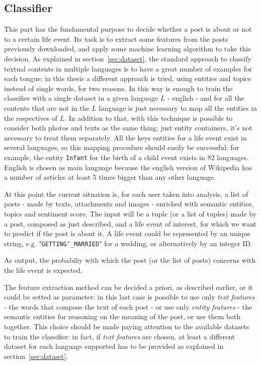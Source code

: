 \subsection{Classifier}
This part has the fundamental purpose to decide whether a post is about or not to a certain life event. Its task is to extract some features from the posts previously downloaded, and apply some machine learning algorithm to take this decision. As explained in section~\ref{sec:dataset}, the standard approach to classify textual contents in multiple languages is to have a great number of examples for each tongue; in this thesis a different approach is tried, using entities and topics instead of single words, for two reasons. In this way is enough to train the classifier with a single dataset in a given language $ L $ - english - and for all the contents that are not in the $ L $ language is just necessary to map all the entities in the respectives of $L$. In addition to that, with this technique is possible to consider both photos and texts as the same thing: just entity containers, it's not necessary to treat them separately. All the keys entities for a life event exist in several languages, so this mapping procedure should easily be successful: for example, the entity \texttt{Infant} for the birth of a child event exists in 82 languages. English is chosen as main language because the english version of Wikipedia has a number of articles at least 5 times bigger than any other language.

At this point the current situation is, for each user taken into analysis, a list of posts - made by texts, attachments and images - enriched with semantic entities, topics and sentiment score. The input will be a tuple (or a list of tuples) made by a post, composed as just described, and a life event of interest, for which we want to predict if the post is about it. A life event could be represented by an unique string, e.g. "\texttt{GETTING\char`_MARRIED}" for a wedding, or alternatively by an integer ID.

As output, the probabiliy with which the post (or the list of posts) concerns with the life event is expected.

The feature extraction method can be decided a priori, as described earlier, or it could be setted as parameter: in this last case is possible to use only \textit{text features} - the words that compose the text of each post - or use only \textit{entity features} - the semantic entities for reasoning on the meaning of the post, or use them both together. This choice should be made paying attention to the available datasets to train the classifier: in fact, if \textit{text features} are chosen, at least a different dataset for each language supported has to be provided as explained in section~\ref{sec:dataset}.

